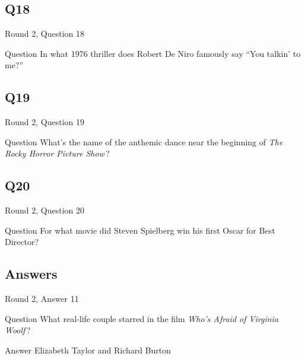 \documentclass[11pt]{beamer}
\begin{document}
\subsection*{Q18}
\begin{frame}[t]{Round 2, Question 18}
\vspace{2em}
\begin{block}{Question}
In what 1976 thriller does Robert De Niro famously say ``You talkin' to me?''
\end{block}
\end{frame}
    

\subsection*{Q19}
\begin{frame}[t]{Round 2, Question 19}
\vspace{2em}
\begin{block}{Question}
What's the name of the anthemic dance near the beginning of \emph{The Rocky Horror Picture Show}\,?
\end{block}
\end{frame}
    

\subsection*{Q20}
\begin{frame}[t]{Round 2, Question 20}
\vspace{2em}
\begin{block}{Question}
For what movie did Steven Spielberg win his first Oscar for Best Director?
\end{block}
\end{frame}
    
\subsection{Answers}

\begin{frame}[t]{Round 2, Answer 11}
\vspace{2em}
\begin{block}{Question}
What real-life couple starred in the film \emph{Who's Afraid of Virginia Woolf}\,?
\end{block}
\pause{}
\begin{block}{Answer}
Elizabeth Taylor and Richard Burton
\end{block}
\end{frame}
    
\end{document}
